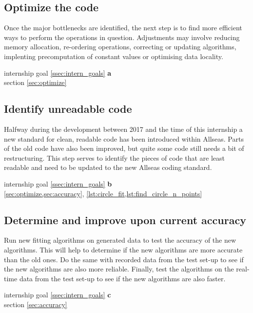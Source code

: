 \subsection{Optimize the code} \label{ssec:optimize_code}
Once the major bottlenecks are identified, the next step is to find more efficient ways to perform the operations in question. Adjustments
may involve reducing memory allocation, re-ordering operations, correcting or updating algorithms, implenting precomputation of constant values
or optimising data locality.
\begin{flushright}
     internship goal \ref{ssec:intern_goals} \textbf{a}\\
    \large{} section \ref{sec:optimize}
\end{flushright}

\subsection{Identify unreadable code} \label{ssec:unreadable_code}
Halfway during the development between 2017 and the time of this internship a new standard for clean, readable code has been
introduced within Allseas. Parts of the old code have also been improved, but quite some code still needs a bit of restructuring.
This step serves to identify the pieces of code that are least readable and need to be updated to the new Allseas coding standard.
\begin{flushright}
     internship goal \ref{ssec:intern_goals} \textbf{b}\\
    \large{} \cref{sec:optimize,sec:accuracy}, \cref{lst:circle_fit,lst:find_circle_n_points}
\end{flushright}

\subsection{Determine and improve upon current accuracy} \label{ssec:test_accuracy}
Run new fitting algorithms on generated data to test the accuracy of the new algorithms.
This will help to determine if the new algorithms are more accurate than the old ones. Do the same
with recorded data from the test set-up to see if the new algorithms are also more reliable. Finally,
test the algorithms on the real-time data from the test set-up to see if the new algorithms are also faster.
\begin{flushright}
     internship goal \ref{ssec:intern_goals} \textbf{c}\\
    \large{} section \ref{sec:accuracy}
\end{flushright}

